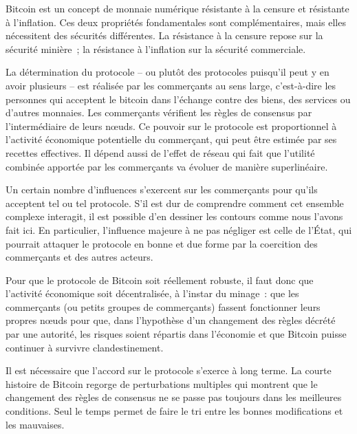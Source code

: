 Bitcoin est un concept de monnaie numérique résistante à la censure et résistante à l'inflation. Ces deux propriétés fondamentales sont complémentaires, mais elles nécessitent des sécurités différentes. La résistance à la censure repose sur la sécurité minière~; la résistance à l'inflation sur la sécurité commerciale.

La détermination du protocole -- ou plutôt des protocoles puisqu'il peut y en avoir plusieurs -- est réalisée par les commerçants au sens large, c'est-à-dire les personnes qui acceptent le bitcoin dans l'échange contre des biens, des services ou d'autres monnaies. Les commerçants vérifient les règles de consensus par l'intermédiaire de leurs nœuds. Ce pouvoir sur le protocole est proportionnel à l'activité économique potentielle du commerçant, qui peut être estimée par ses recettes effectives. Il dépend aussi de l'effet de réseau qui fait que l'utilité combinée apportée par les commerçants va évoluer de manière superlinéaire.

Un certain nombre d'influences s'exercent sur les commerçants pour qu'ils acceptent tel ou tel protocole. S'il est dur de comprendre comment cet ensemble complexe interagit, il est possible d'en dessiner les contours comme nous l'avons fait ici. En particulier, l'influence majeure à ne pas négliger est celle de l'État, qui pourrait attaquer le protocole en bonne et due forme par la coercition des commerçants et des autres acteurs.

Pour que le protocole de Bitcoin soit réellement robuste, il faut donc que l'activité économique soit décentralisée, à l'instar du minage~: que les commerçants (ou petits groupes de commerçants) fassent fonctionner leurs propres nœuds pour que, dans l'hypothèse d'un changement des règles décrété par une autorité, les risques soient répartis dans l'économie et que Bitcoin puisse continuer à survivre clandestinement.

Il est nécessaire que l'accord sur le protocole s'exerce à long terme. La courte histoire de Bitcoin regorge de perturbations multiples qui montrent que le changement des règles de consensus ne se passe pas toujours dans les meilleures conditions. Seul le temps permet de faire le tri entre les bonnes modifications et les mauvaises.